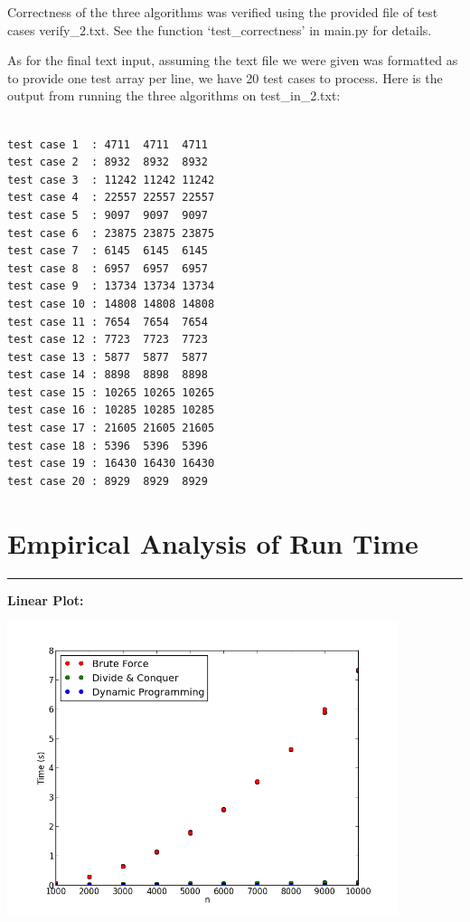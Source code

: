 \documentclass[letterpaper,10pt,titlepage,fleqn]{article}
\begin{document}
Correctness of the three algorithms was verified using the provided file of test cases verify\_2.txt. See the function `test\_correctness' in main.py for details. 

As for the final text input, assuming the text file we were given was formatted as to provide one test array per line, we have 20 test cases to process. Here is the output from running the three algorithms on test\_in\_2.txt:

\begin{lstlisting}

test case 1  : 4711  4711  4711
test case 2  : 8932  8932  8932
test case 3  : 11242 11242 11242
test case 4  : 22557 22557 22557
test case 5  : 9097  9097  9097
test case 6  : 23875 23875 23875
test case 7  : 6145  6145  6145
test case 8  : 6957  6957  6957
test case 9  : 13734 13734 13734
test case 10 : 14808 14808 14808
test case 11 : 7654  7654  7654
test case 12 : 7723  7723  7723
test case 13 : 5877  5877  5877
test case 14 : 8898  8898  8898
test case 15 : 10265 10265 10265
test case 16 : 10285 10285 10285
test case 17 : 21605 21605 21605
test case 18 : 5396  5396  5396
test case 19 : 16430 16430 16430
test case 20 : 8929  8929  8929

\end{lstlisting}

\newpage

\section*{Empirical Analysis of Run Time}
\hrule
\textbf{Linear Plot:}
\vskip 0.04in

\begin{center}
\includegraphics[width=4.5in]{linear.png}
\end{center}
\end{document}
